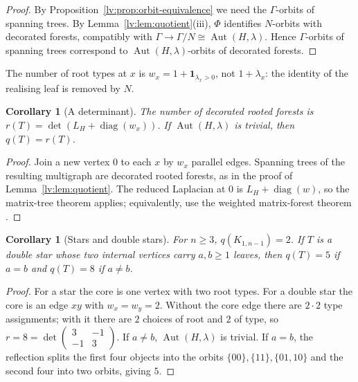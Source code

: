 \documentclass[11pt,a4paper]{article}
\newtheorem{corollary}[theorem]{Corollary}
\theoremstyle{definition}
\theoremstyle{remark}
\newcommand{\Aut}{\operatorname{Aut}}
\begin{document}
\begin{proof}
By Proposition~\ref{lv:prop:orbit-equivalence} we need the $\Gamma$-orbits of spanning trees. By Lemma~\ref{lv:lem:quotient}(iii), $\Phi$ identifies $N$-orbits with decorated forests, compatibly with $\Gamma\to\Gamma/N\cong\Aut(H,\lambda)$. Hence $\Gamma$-orbits of spanning trees correspond to $\Aut(H,\lambda)$-orbits of decorated forests.
\end{proof}

The number of root types at $x$ is $w_x=1+\mathbf 1_{\lambda_x>0}$, not $1+\lambda_x$: the identity of the realising leaf is removed by $N$.

\begin{corollary}[A determinant]
\label{lv:cor:core-determinant}
The number of decorated rooted forests is $r(T)=\det(L_H+\operatorname{diag}(w_x))$. If $\Aut(H,\lambda)$ is trivial, then $q(T)=r(T)$.
\end{corollary}

\begin{proof}
Join a new vertex $0$ to each $x$ by $w_x$ parallel edges. Spanning trees of the resulting multigraph are decorated rooted forests, as in the proof of Lemma~\ref{lv:lem:quotient}. The reduced Laplacian at $0$ is $L_H+\operatorname{diag}(w)$, so the matrix-tree theorem applies; equivalently, use the weighted matrix-forest theorem \cite{lv:CS1997}.
\end{proof}

\begin{corollary}[Stars and double stars]
\label{lv:cor:stars}
For $n\geq3$, $q(K_{1,n-1})=2$. If $T$ is a double star whose two internal vertices carry $a,b\geq1$ leaves, then $q(T)=5$ if $a=b$ and $q(T)=8$ if $a\neq b$.
\end{corollary}

\begin{proof}
For a star the core is one vertex with two root types. For a double star the core is an edge $xy$ with $w_x=w_y=2$. Without the core edge there are $2\cdot2$ type assignments; with it there are $2$ choices of root and $2$ of type, so $r=8=\det\begin{pmatrix}3&-1\\-1&3\end{pmatrix}$. If $a\neq b$, $\Aut(H,\lambda)$ is trivial. If $a=b$, the reflection splits the first four objects into the orbits $\{00\},\{11\},\{01,10\}$ and the second four into two orbits, giving $5$.
\end{proof}
\end{document}
